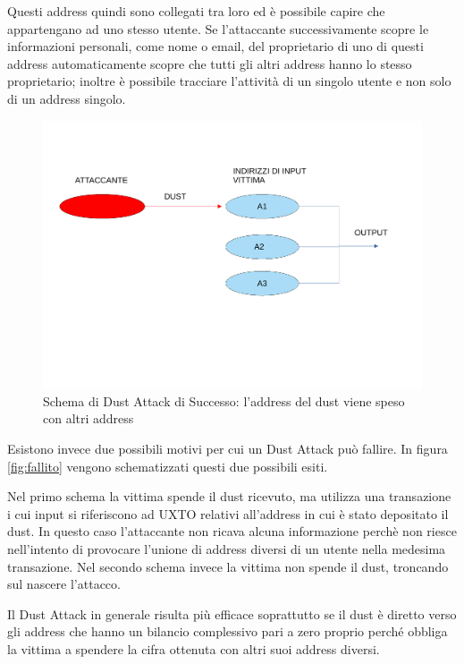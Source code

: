 Questi address quindi sono collegati tra loro ed è possibile capire che appartengano ad uno stesso utente. Se l'attaccante successivamente scopre le informazioni personali, come nome o email, del proprietario di uno di questi address automaticamente scopre che tutti gli altri address hanno lo stesso proprietario; inoltre è possibile tracciare l'attività di un singolo utente e non solo di un address singolo.
\begin{figure}[h!]
    \centering
    \includegraphics[scale=0.5,trim = 1cm 6cm 0cm 3cm, clip]{Images/successo.pdf}
    \caption{Schema di Dust Attack di Successo: l'address del dust viene speso con altri address}
    \label{fig:success}
\end{figure}
\FloatBarrier
Esistono invece due possibili motivi per cui un Dust Attack può fallire. In figura \ref{fig:fallito} vengono schematizzati questi due possibili esiti.

Nel primo schema la vittima spende il dust ricevuto, ma utilizza una transazione i cui input si riferiscono ad UXTO relativi all'address in cui è stato depositato il dust. In questo caso l'attaccante non ricava alcuna informazione perchè non riesce nell'intento di provocare l'unione di address diversi di un utente nella medesima transazione. Nel secondo schema invece la vittima non spende il dust, troncando sul nascere l'attacco. 

Il Dust Attack in generale risulta più efficace soprattutto se il dust è diretto verso gli address che hanno un bilancio complessivo pari a zero proprio perché obbliga la vittima a spendere la cifra ottenuta con altri suoi address diversi.

